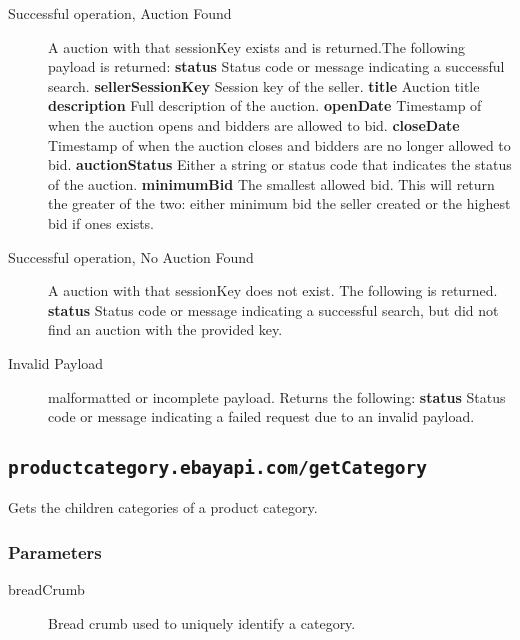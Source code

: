 \documentclass{article}
\newcommand{\code}[1]{\colorbox{light-gray}{\texttt{#1}}}
\begin{document}
\begin{description}
    \item[Successful operation, Auction Found] A auction with that sessionKey exists and is
        returned.The following payload is
        returned:
        \subitem\textbf{status} Status code or message indicating a successful
        search.
        \subitem\textbf{sellerSessionKey} Session key of the seller.
        \subitem\textbf{title} Auction title
        \subitem\textbf{description} Full description of the auction.
        \subitem\textbf{openDate} Timestamp of when the auction opens and bidders are allowed to bid.
        \subitem\textbf{closeDate} Timestamp of when the auction closes and bidders are no longer allowed to bid.
        \subitem\textbf{auctionStatus} Either a string or status code that indicates the status of the auction.
        \subitem\textbf{minimumBid} The smallest allowed bid. This will return the greater of the two: either minimum bid the seller created or the highest bid if ones exists.

    \item[Successful operation, No Auction Found] A auction with that
        sessionKey does not exist. The following is returned.
        \subitem\textbf{status} Status code or message indicating a successful
        search, but did not find an auction with the provided key.

    \item[Invalid Payload] malformatted or incomplete payload. Returns the
        following:
        \subitem\textbf{status} Status code or message indicating a failed
        request due to an invalid payload.

\end{description}

\subsection{\code{productcategory.ebayapi.com/getCategory}}
Gets the children categories of a product category.

\subsubsection{Parameters}

\begin{description}
    \item[breadCrumb] Bread crumb used to uniquely identify a category.
\end{description}
\end{document}
